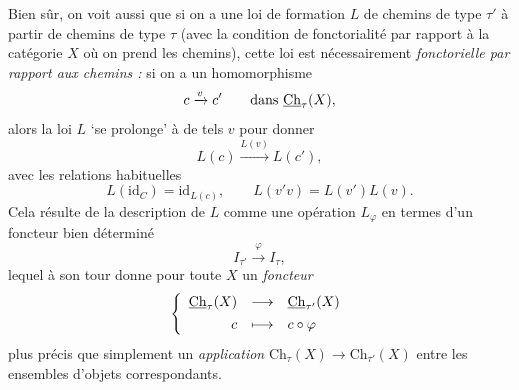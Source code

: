 Bien sûr, on voit aussi que si on a une loi de formation $L$ de chemins de type $\tau'$ à partir de chemins de type $\tau$ (avec la condition de fonctorialité par rapport à la catégorie $X$ où on prend les chemins), cette loi est nécessairement \textit{fonctorielle par rapport aux chemins :} si on a un homomorphisme
\[
c \xrightarrow{v} c' \qquad \text{dans } \underline{\mathrm{Ch}}_\tau(X),
\]
alors la loi $L$ ‘se prolonge’ à de tels $v$ pour donner
\[
L(c) \xrightarrow{L(v)} L(c'),
\]
avec les relations habituelles
\[
L(\mathrm{id}_C)=\mathrm{id}_{L(c)}, \qquad L(v'v)=L(v')L(v). %
\]
Cela résulte de la description de $L$ comme une opération $L_\varphi$ en termes d'un foncteur bien déterminé
\[
I_{\tau'} \xrightarrow{\varphi} I_\tau,
\]
lequel à son tour donne pour toute $X$ un \textit{foncteur}
\[
\left\{
\begin{array}{rcl}
\underline{\mathrm{Ch}}_\tau(X) & \longrightarrow & \underline{\mathrm{Ch}}_{\tau'}(X)\\[1ex]
c & \longmapsto & c\circ\varphi
\end{array}
\right.
\]
plus précis que simplement un \textit{application} $\mathrm{Ch}_\tau(X)\longrightarrow\mathrm{Ch}_{\tau'}(X)$ entre les ensembles d'objets correspondants. %

